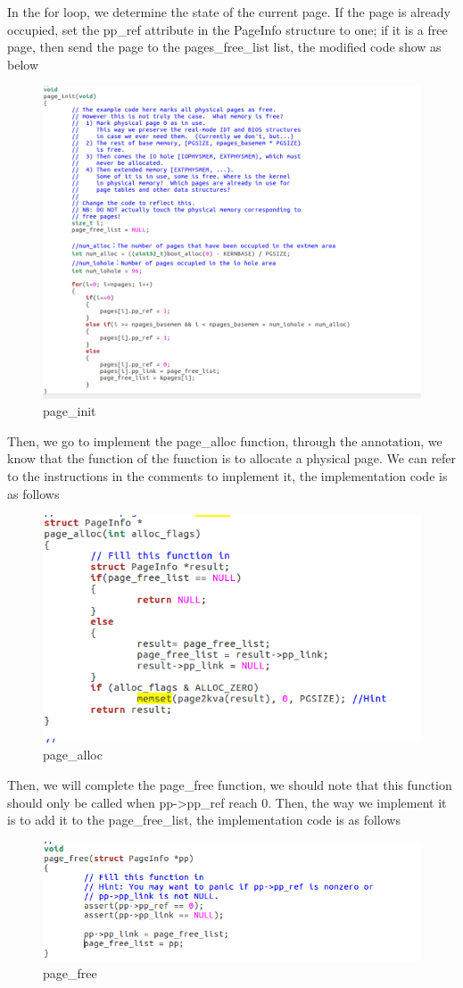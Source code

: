 In the for loop, we determine the state of the current page. If the page is already occupied, set the pp\_ref attribute in the PageInfo structure to one; if it is a free page, then send the page to the pages\_free\_list list, the modified code show as below
\begin{figure}[H]
\centering
\includegraphics[width=0.8\linewidth]{figure/page_init_changed}
\caption{page\_init}
\end{figure}


Then, we go to implement the page\_alloc function, through the annotation, we know that the function of the function is to allocate a physical page. We can refer to the instructions in the comments to implement it, the implementation code is as follows
\begin{figure}[H]
\centering
\includegraphics[width=0.8\linewidth]{figure/page_alloc_changed}
\caption{page\_alloc}
\end{figure}

Then, we will complete the page\_free function, we should note that this function should only be called when pp->pp\_ref reach 0. Then, the way we implement it is to add it to the page\_free\_list, the implementation code is as follows
\begin{figure}[H]
\centering
\includegraphics[width=0.8\linewidth]{figure/page_free_changed}
\caption{page\_free}
\end{figure}

